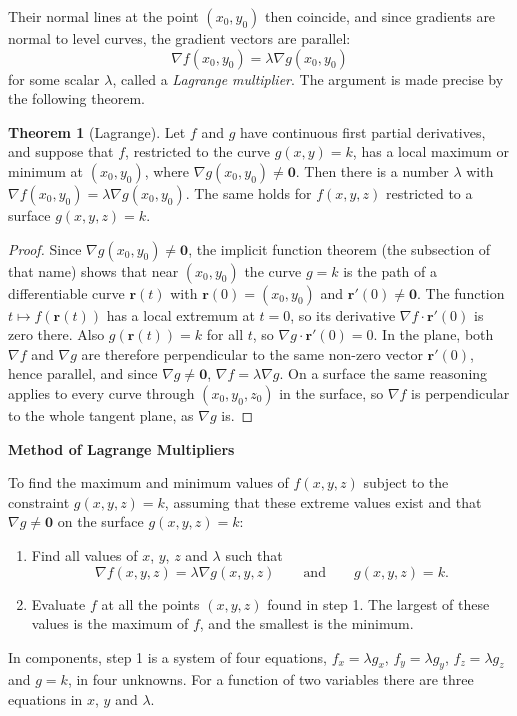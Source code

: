 \documentclass[11pt,a4paper]{article}
\theoremstyle{definition}
\newtheorem{thm}{Theorem}[subsection]
\newcommand{\subhead}[1]{%
  \par\medskip\noindent\textbf{#1}\par\nobreak\smallskip}
\begin{document}
Their normal lines at the point $(x_0,y_0)$ then coincide, and since gradients
are normal to level curves, the gradient vectors are parallel:
\[ \nabla f(x_0,y_0) = \lambda \nabla g(x_0,y_0)\]
for some scalar $\lambda$, called a \emph{Lagrange multiplier}. The argument is
made precise by the following theorem.

\begin{thm}[Lagrange]
\label{thm:lagrange}
Let $f$ and $g$ have continuous first partial derivatives, and suppose that $f$,
restricted to the curve $g(x,y) = k$, has a local maximum or minimum at
$(x_0,y_0)$, where $\nabla g(x_0,y_0)\neq\mathbf 0$. Then there is a number
$\lambda$ with $\nabla f(x_0,y_0) = \lambda\nabla g(x_0,y_0)$. The same holds
for $f(x,y,z)$ restricted to a surface $g(x,y,z) = k$.
\end{thm}

\begin{proof}
Since $\nabla g(x_0,y_0)\neq\mathbf 0$, the implicit function theorem (the
subsection of that name) shows that near $(x_0,y_0)$ the curve $g = k$ is the
path of a differentiable curve $\mathbf r(t)$ with $\mathbf r(0) = (x_0,y_0)$
and $\mathbf r'(0)\neq\mathbf 0$. The function $t\mapsto f(\mathbf r(t))$ has a
local extremum at $t = 0$, so its derivative $\nabla f\cdot\mathbf r'(0)$ is
zero there. Also $g(\mathbf r(t)) = k$ for all $t$, so
$\nabla g\cdot\mathbf r'(0) = 0$. In the plane, both $\nabla f$ and $\nabla g$
are therefore perpendicular to the same non-zero vector $\mathbf r'(0)$, hence
parallel, and since $\nabla g\neq\mathbf 0$, $\nabla f = \lambda\nabla g$. On a
surface the same reasoning applies to every curve through $(x_0,y_0,z_0)$ in the
surface, so $\nabla f$ is perpendicular to the whole tangent plane, as $\nabla g$
is.
\end{proof}

\subhead{Method of Lagrange Multipliers}

To find the maximum and minimum values of $f(x,y,z)$ subject to the constraint
$g(x,y,z) = k$, assuming that these extreme values exist and that
$\nabla g \neq \mathbf 0$ on the surface $g(x,y,z) = k$:
\begin{enumerate}
\item Find all values of $x$, $y$, $z$ and $\lambda$ such that
\[\nabla f(x,y,z) = \lambda \nabla g(x,y,z)\qquad\text{and}\qquad g(x,y,z) =
k .\]

\item Evaluate $f$ at all the points $(x,y,z)$ found in step 1. The largest of
these values is the maximum of $f$, and the smallest is the minimum.
\end{enumerate}
In components, step 1 is a system of four equations, $f_x = \lambda g_x$,
$f_y = \lambda g_y$, $f_z = \lambda g_z$ and $g = k$, in four unknowns. For a
function of two variables there are three equations in $x$, $y$ and $\lambda$.
\end{document}

